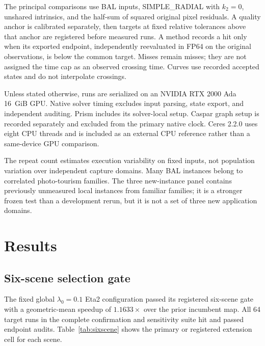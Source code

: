 \documentclass[10pt]{article}
\begin{document}
The principal comparisons use BAL inputs, SIMPLE\_RADIAL with $k_2=0$, unshared intrinsics, and the half-sum of squared original pixel residuals.  A quality anchor is calibrated separately, then targets at fixed relative tolerances above that anchor are registered before measured runs.  A method records a hit only when its exported endpoint, independently reevaluated in FP64 on the original observations, is below the common target.  Misses remain misses; they are not assigned the time cap as an observed crossing time.  Curves use recorded accepted states and do not interpolate crossings.

Unless stated otherwise, runs are serialized on an NVIDIA RTX 2000 Ada 16~GiB GPU.  Native solver timing excludes input parsing, state export, and independent auditing.  Prism includes its solver-local setup.  Caspar graph setup is recorded separately and excluded from the primary native clock.  Ceres 2.2.0 uses eight CPU threads and is included as an external CPU reference rather than a same-device GPU comparison.

The repeat count estimates execution variability on fixed inputs, not population variation over independent capture domains.  Many BAL instances belong to correlated photo-tourism families.  The three new-instance panel contains previously unmeasured local instances from familiar families; it is a stronger frozen test than a development rerun, but it is not a set of three new application domains.

\section{Results}

\subsection{Six-scene selection gate}

The fixed global $\lambda_0=0.1$ Eta2 configuration passed its registered six-scene gate with a geometric-mean speedup of $1.1633\times$ over the prior incumbent map.  All 64 target runs in the complete confirmation and sensitivity suite hit and passed endpoint audits.  Table~\ref{tab:sixscene} shows the primary or registered extension cell for each scene.
\end{document}

